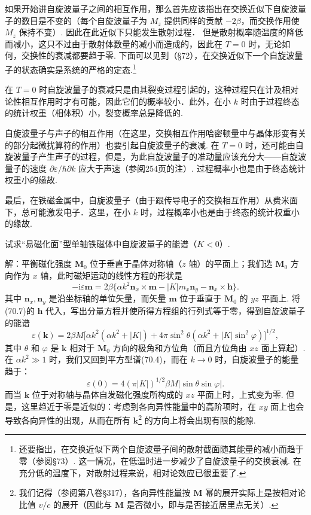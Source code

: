 如果开始讲自旋波量子之间的相互作用，那么首先应该指出在交换近似下自旋波量子的数目是不变的（每个自旋波量子为 $M_z$ 提供同样的贡献 $-2\beta$，而交换作用使 $M_z$ 保持不变）. 因此在此近似下只能发生散射过程． 但是散射概率随温度的降低而减小，这只不过由于散射体数量的减小而造成的，因此在 $T=0$ 时，无论如何，交换性的衰减都要趋于零. 下面可以见到（§72），在交换近似下一个自旋波量子的状态确实是系统的严格的定态.\footnote{还要指出，在交换近似下两个自旋波量子间的散射截面随其能量的减小而趋于零（参阅§73）. 这一情况，在低温时进一步减少了自旋波量子的交换衰减. 在充分低的温度下，对散射过程来说，相对论效应已很重要了.}

在 $T=0$ 时自旋波量子的衰减只是由其裂变过程引起的，这种过程只在计及相对论性相互作用时才有可能，因此它们的概率较小．此外，在小 $k$ 时由于过程终态的统计权重（相体积）小，裂变概率总是降低的.

自旋波量子与声子的相互作用（在这里，交换相互作用哈密顿量中与晶体形变有关的部分起微扰算符的作用）也要引起自旋波量子的衰减. 在 $T=0$ 时，还可能由自旋波量子产生声子的过程，但是，为此自旋波量子的准动量应该充分大——自旋波量子的速度 $\partial\varepsilon/\hbar\partial k$ 应大于声速（参阅254页的注）. 过程概率小也是由于终态统计权重小的缘故.

最后，在铁磁金属中，自旋波量子（由于跟传导电子的交换相互作用）从费米面下，总可能激发电子．这里，在小 $k$ 时，过程概率小也是由于终态的统计权重小的缘故.

\begin{xiti}

试求“易磁化面”型单轴铁磁体中自旋波量子的能谱（$K<0$）.

{\heiti 解：}平衡磁化强度 $\bm{M}_0$ 位于垂直于晶体对称轴（$z$ 轴）的平面上；我们选 $\bm{M}_0$ 方向作为 $x$ 轴，此时磁矩运动的线性方程的形状是
\begin{equation*}
-\mathrm{i}\varepsilon\bm{m}=2\beta\{\alpha k^2\bm{n}_x\times\bm{m}
-|K|m_x\bm{n}_y-\bm{n}_x\times\bm{h}\}.
\end{equation*}
其中 $\bm{n}_x,\bm{n}_y$ 是沿坐标轴的单位矢量，而矢量 $\bm{m}$ 位于垂直于 $\bm{M}_0$ 的 $yz$ 平面上. 将 (70.7)的 $\bm{h}$ 代入，写出分量方程并使所得方程组的行列式等于零，得到自旋波量子的能谱
\begin{equation*}
\varepsilon(\bm{k})=2\beta M\bigl[\alpha k^2(\alpha k^2+|K|)
+4\pi\sin^2\theta(\alpha k^2+|K|\sin^2\varphi)\bigr]^{1/2},
\end{equation*}
其中 $\theta$ 和 $\varphi$ 是 $\bm{k}$ 相对于 $\bm{M}_0$ 方向的极角和方位角（而且方位角由 $xz$ 面上算起）. 在 $\alpha k^2\gg1$ 时，我们又回到平方型谱(70.4)，而在 $k\to0$ 时，自旋波量子的能量趋于：
\begin{equation*}
\varepsilon(0)=4(\pi|K|)^{1/2}\beta M|\sin\theta\sin\varphi|.
\end{equation*}
而当 $\bm{k}$ 位于对称轴与晶体自发磁化强度所构成的 $xz$ 平面上时，上式变为零. 但是，这里趋近于零是近似的：考虑到各向异性能量中的高阶项时，在 $xy$ 面上也会导致各向异性的出现，从而在所有 $\bm{k}$\footnote{我们记得（参阅第八卷§317），各向异性能量按 $\bm{M}$ 幂的展开实际上是按相对论比值 $v/c$ 的展开（因此与 $\bm{M}$ 是否微小，即与是否接近居里点无关）.} 的方向上将会出现有限的能隙.

\end{xiti}

